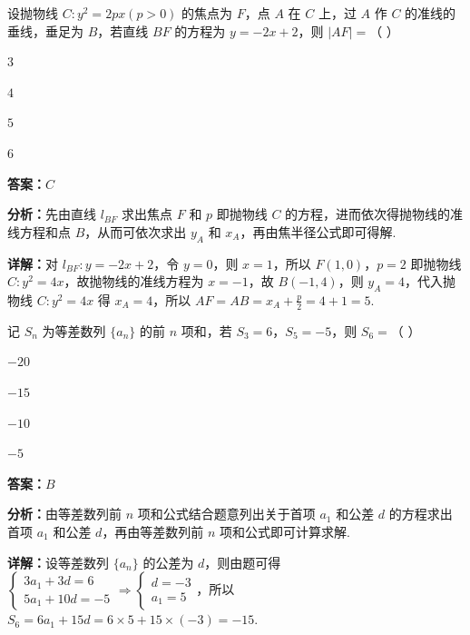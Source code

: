 \begin{question}[points=5]
设抛物线 $C:y^2=2px(p>0)$ 的焦点为 $F$，点 $A$ 在 $C$ 上，过 $A$ 作 $C$ 的准线的垂线，垂足为 $B$，若直线 $BF$ 的方程为 $y=-2x+2$，则 $|AF|=$（ ）
\begin{choices}
  \item $3$
  \item $4$
  \item $5$
  \item $6$
\end{choices}
\begin{solution}
\textbf{答案：}$C$

\textbf{分析：}先由直线 $l_{BF}$ 求出焦点 $F$ 和 $p$ 即抛物线 $C$ 的方程，进而依次得抛物线的准线方程和点 $B$，从而可依次求出 $y_A$ 和 $x_A$，再由焦半径公式即可得解.

\textbf{详解：}对 $l_{BF}:y=-2x+2$，令 $y=0$，则 $x=1$，所以 $F(1,0)$，$p=2$ 即抛物线 $C:y^2=4x$，故抛物线的准线方程为 $x=-1$，故 $B(-1,4)$，则 $y_A=4$，代入抛物线 $C:y^2=4x$ 得 $x_A=4$，所以 $AF=AB=x_A+\frac{p}{2}=4+1=5$.
\end{solution}
\end{question}

\begin{question}[points=5]
记 $S_n$ 为等差数列 $\{a_n\}$ 的前 $n$ 项和，若 $S_3=6$，$S_5=-5$，则 $S_6=$（ ）
\begin{choices}
  \item $-20$
  \item $-15$
  \item $-10$
  \item $-5$
\end{choices}
\begin{solution}
\textbf{答案：}$B$

\textbf{分析：}由等差数列前 $n$ 项和公式结合题意列出关于首项 $a_1$ 和公差 $d$ 的方程求出首项 $a_1$ 和公差 $d$，再由等差数列前 $n$ 项和公式即可计算求解.

\textbf{详解：}设等差数列 $\{a_n\}$ 的公差为 $d$，则由题可得 $\begin{cases}3a_1+3d=6\\5a_1+10d=-5\end{cases}\Rightarrow\begin{cases}d=-3\\a_1=5\end{cases}$，所以 $S_6=6a_1+15d=6\times5+15\times(-3)=-15$.
\end{solution}
\end{question}

